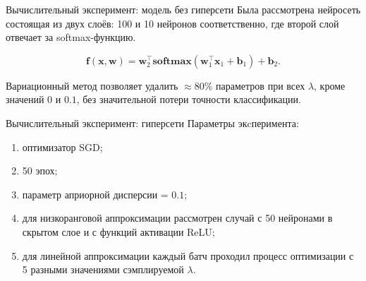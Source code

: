 \documentclass[9pt,pdf,hyperref={unicode}]{beamer}
\begin{document}
\begin{frame}{Вычислительный эксперимент: модель без гиперсети}
Была рассмотрена нейросеть состоящая из двух слоёв: 100 и 10 нейронов соответственно,
где второй слой отвечает за softmax-функцию.

$$\mathbf{f}(\mathbf{x}, \mathbf{w})= \mathbf{w}_2^{\top} \textbf{softmax}(\mathbf{w}_1^{\top} \mathbf{x}_1  + \mathbf{b}_1) + \mathbf{b}_2.$$
	\begin{figure}[h]
    \label{ris:image1}
    \end{figure}
Вариационный метод позволяет удалить $ \approx 80\% $ параметров при всех $\lambda$, кроме значений $0$  и $0.1$, без значительной потери точности классификации.
\end{frame}
\begin{frame}{Вычислительный эксперимент: гиперсети}
Параметры экcперимента:
\begin{enumerate}
	\justifying
		\item  оптимизатор SGD;
		\item  50 эпох;
		\item  параметр априорной дисперсии = $0.1$;
	    \item  для низкоранговой аппроксимации рассмотрен случай с 50 нейронами в скрытом слое и с функций активации ReLU;
		\item  для линейной аппроксимации каждый батч проходил процесс оптимизации с 5 разными значениями сэмплируемой $\lambda$.
	\end{enumerate}
\end{frame}
\end{document}
